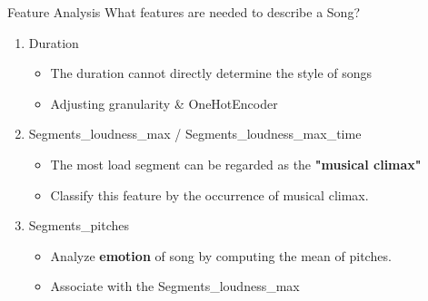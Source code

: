 \documentclass{beamer}
\begin{document}
\begin{frame}{Feature Analysis}
What features are needed to describe a Song?

\begin{enumerate}
    \item \textrm{Duration}
    \begin{itemize}
        \item The duration cannot directly determine the style of songs
        \item Adjusting granularity \& OneHotEncoder
        
    \end{itemize}

    \item \textrm{Segments\_loudness\_max / Segments\_loudness\_max\_time}
    \begin{itemize}
        \item The most load segment can be regarded as the \textbf{"musical climax"}
        \item Classify this feature by the occurrence of musical climax. 
    \end{itemize}

    \item \textrm{Segments\_pitches}
    \begin{itemize}
        \item Analyze \textbf{emotion} of song by computing the mean of pitches.
        \item Associate with the \textrm{Segments\_loudness\_max} 
    \end{itemize}
    
\end{enumerate}


\end{frame}
\end{document}
